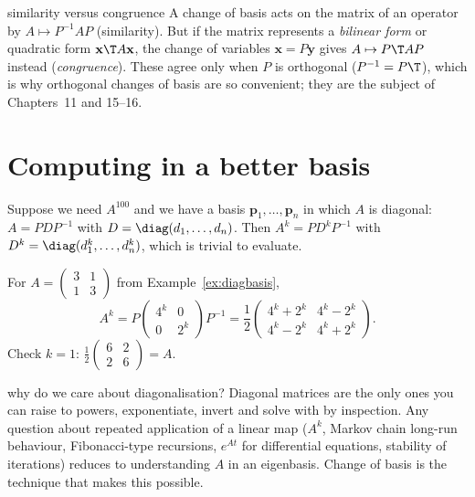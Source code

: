 \begin{nuance}{similarity versus congruence}
A change of basis acts on the matrix of an operator by $A\mapsto P^{-1}AP$ (similarity). But if the matrix represents a \emph{bilinear form} or quadratic form $\mathbf{x}\T A\mathbf{x}$, the change of variables $\mathbf{x}=P\mathbf{y}$ gives $A\mapsto P\T AP$ instead (\emph{congruence}). These agree only when $P$ is orthogonal ($P^{-1}=P\T$), which is why orthogonal changes of basis are so convenient; they are the subject of Chapters~11 and 15--16.
\end{nuance}

\section{Computing in a better basis}

Suppose we need $A^{100}$ and we have a basis $\mathbf{p}_1,\dots,\mathbf{p}_n$ in which $A$ is diagonal: $A=PDP^{-1}$ with $D=\diag(d_1,\dots,d_n)$. Then $A^k=PD^kP^{-1}$ with $D^k=\diag(d_1^k,\dots,d_n^k)$, which is trivial to evaluate.

\begin{example}
For $A=\begin{pmatrix}3&1\\1&3\end{pmatrix}$ from Example~\ref{ex:diagbasis},
\[ A^k=P\begin{pmatrix}4^k&0\\0&2^k\end{pmatrix}P^{-1}=\frac12\begin{pmatrix}4^k+2^k&4^k-2^k\\4^k-2^k&4^k+2^k\end{pmatrix}. \]
Check $k=1$: $\frac12\begin{pmatrix}6&2\\2&6\end{pmatrix}=A$.
\end{example}

\begin{interview}{why do we care about diagonalisation?}
Diagonal matrices are the only ones you can raise to powers, exponentiate, invert and solve with by inspection. Any question about repeated application of a linear map ($A^k$, Markov chain long-run behaviour, Fibonacci-type recursions, $e^{At}$ for differential equations, stability of iterations) reduces to understanding $A$ in an eigenbasis. Change of basis is the technique that makes this possible.
\end{interview}

